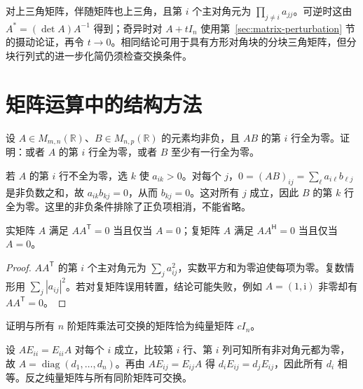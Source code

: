 对上三角矩阵，伴随矩阵也上三角，且第 $i$ 个主对角元为 $\prod_{j\ne i}a_{jj}$。可逆时这由 $A^*=(\det A)A^{-1}$ 得到；奇异时对 $A+tI_n$ 使用第~\ref{sec:matrix-perturbation} 节的摄动论证，再令 $t\to0$。相同结论可用于具有方形对角块的分块三角矩阵，但分块行列式的进一步化简仍须检查交换条件。

\section{矩阵运算中的结构方法}
\label{sec:matrix-calculation}

\begin{example}
\label{ex:matrix-positive-products}
设 $A\in M_{m,n}(\mathbb R)$、$B\in M_{n,p}(\mathbb R)$ 的元素均非负，且 $AB$ 的第 $i$ 行全为零。证明：或者 $A$ 的第 $i$ 行全为零，或者 $B$ 至少有一行全为零。
\end{example}
\begin{solve}
若 $A$ 的第 $i$ 行不全为零，选 $k$ 使 $a_{ik}>0$。对每个 $j$，$0=(AB)_{ij}=\sum_\ell a_{i\ell}b_{\ell j}$ 是非负数之和，故 $a_{ik}b_{kj}=0$，从而 $b_{kj}=0$。这对所有 $j$ 成立，因此 $B$ 的第 $k$ 行全为零。这里的非负条件排除了正负项相消，不能省略。
\end{solve}

\begin{proposition}
\label{prop:matrix-positive-zero}
实矩阵 $A$ 满足 $AA^{\mathsf T}=0$ 当且仅当 $A=0$；复矩阵 $A$ 满足 $AA^{\mathsf H}=0$ 当且仅当 $A=0$。
\end{proposition}
\begin{proof}
$AA^{\mathsf T}$ 的第 $i$ 个主对角元为 $\sum_j a_{ij}^2$，实数平方和为零迫使每项为零。复数情形用 $\sum_j|a_{ij}|^2$。若对复矩阵误用转置，结论可能失败，例如 $A=(1,\mathrm i)$ 非零却有 $AA^{\mathsf T}=0$。
\end{proof}

\begin{example}
\label{ex:matrix-center}
证明与所有 $n$ 阶矩阵乘法可交换的矩阵恰为纯量矩阵 $cI_n$。
\end{example}
\begin{solve}
设 $AE_{ii}=E_{ii}A$ 对每个 $i$ 成立，比较第 $i$ 行、第 $i$ 列可知所有非对角元都为零，故 $A=\operatorname{diag}(d_1,\ldots,d_n)$。再由 $AE_{ij}=E_{ij}A$ 得 $d_iE_{ij}=d_jE_{ij}$，因此所有 $d_i$ 相等。反之纯量矩阵与所有同阶矩阵可交换。
\end{solve}

